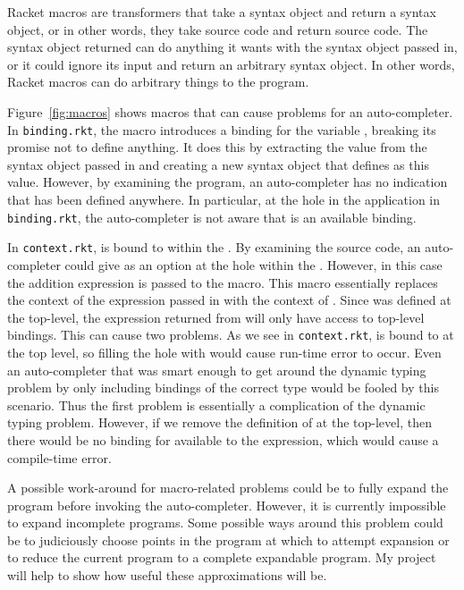 \documentclass[ms,electronic,twosidetoc,letterpaper,chaptercenter,parttop,lol,lof,lot]{byumsphd}
\begin{document}
Racket macros are transformers that take a syntax object and return a syntax object, or in other words, they take source code and return source code. The syntax object returned can do anything it wants with the syntax object passed in, or it could ignore its input and return an arbitrary syntax object. In other words, Racket macros can do arbitrary things to the program.

Figure~\ref{fig:macros} shows macros that can cause problems for an auto-completer. In \texttt{binding.rkt}, the  macro introduces a binding for the variable , breaking its promise not to define anything. It does this by extracting the value from the syntax object passed in and creating a new syntax object that defines  as this value. However, by examining the program, an auto-completer has no indication that  has been defined anywhere. In particular, at the hole in the \scheme{+} application in \texttt{binding.rkt}, the auto-completer is not aware that  is an available binding.

In \texttt{context.rkt},  is bound to  within the . By examining the source code, an auto-completer could give  as an option at the hole within the . However, in this case the addition expression is passed to the  macro. This macro essentially replaces the context of the expression passed in with the context of . Since  was defined at the top-level, the expression returned from  will only have access to top-level bindings. This can cause two problems. As we see in \texttt{context.rkt},  is bound to  at the top level, so filling the hole with  would cause run-time error to occur. Even an auto-completer that was smart enough to get around the dynamic typing problem by only including bindings of the correct type would be fooled by this scenario. Thus the first problem is essentially a complication of the dynamic typing problem. However, if we remove the definition of  at the top-level, then there would be no binding for  available to the expression, which would cause a compile-time error.

A possible work-around for macro-related problems could be to fully expand the program before invoking the auto-completer. However, it is currently impossible to expand incomplete programs. Some possible ways around this problem could be to judiciously choose points in the program at which to attempt expansion or to reduce the current program to a complete expandable program. My project will help to show how useful these approximations will be.
\end{document}
